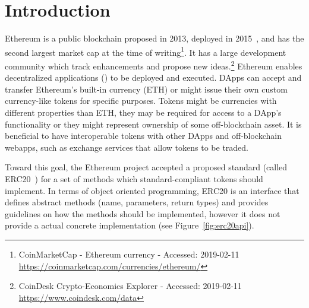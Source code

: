 
\section{Introduction}



Ethereum is a public blockchain proposed in 2013, deployed in 2015~\cite{Ref00}, and has the second largest market cap at the time of writing\footnote{CoinMarketCap - Ethereum currency - Accessed: 2019-02-11 \newline\url{https://coinmarketcap.com/currencies/ethereum/}}. It has a large development community which track enhancements and propose new ideas.\footnote{CoinDesk Crypto-Economics Explorer - Accessed: 2019-02-11 \newline\url{https://www.coindesk.com/data}} Ethereum enables decentralized applications (\dapps) to be deployed and executed. DApps can accept and transfer Ethereum's built-in currency (ETH) or might issue their own custom currency-like tokens for specific purposes. Tokens might be currencies with different properties than ETH, they may be required for access to a DApp's functionality or they might represent ownership of some off-blockchain asset. It is beneficial to have interoperable tokens with other DApps and off-blockchain webapps, such as exchange services that allow tokens to be traded.

Toward this goal, the Ethereum project accepted a proposed standard (called ERC20~\cite{Ref08}) for a set of methods which standard-compliant tokens should implement. In terms of object oriented programming, ERC20 is an interface that defines abstract methods (name, parameters, return types) and provides guidelines on how the methods should be implemented, however it does not provide a actual concrete implementation (see Figure~\ref{fig:erc20api}). 

